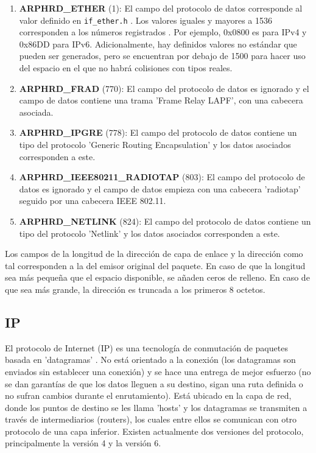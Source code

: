 \begin{enumerate}
    \item \textbf{ARPHRD\_ETHER} (1): El campo del protocolo de datos corresponde al valor definido en \texttt{if\_ether.h} \cite{linuxifether}. Los valores iguales y mayores a 1536 corresponden a los números registrados \cite{etherprotocolnumbers}. Por ejemplo, 0x0800 es para IPv4 y 0x86DD para IPv6. Adicionalmente, hay definidos valores no estándar que pueden ser generados, pero se encuentran por debajo de 1500 para hacer uso del espacio en el que no habrá colisiones con tipos reales.
    \item \textbf{ARPHRD\_FRAD} (770): El campo del protocolo de datos es ignorado y el campo de datos contiene una trama 'Frame Relay LAPF', con una cabecera asociada. 
    \item \textbf{ARPHRD\_IPGRE} (778): El campo del protocolo de datos contiene un tipo del protocolo 'Generic Routing Encapsulation' y los datos asociados corresponden a este.
    \item \textbf{ARPHRD\_IEEE80211\_RADIOTAP} (803): El campo del protocolo de datos es ignorado y el campo de datos empieza con una cabecera 'radiotap' seguido por una cabecera IEEE 802.11.
    \item \textbf{ARPHRD\_NETLINK} (824): El campo del protocolo de datos contiene un tipo del protocolo 'Netlink' y los datos asociados corresponden a este.
\end{enumerate}

Los campos de la longitud de la dirección de capa de enlace y la dirección como tal corresponden a la del emisor original del paquete. En caso de que la longitud sea más pequeña que el espacio disponible, se añaden ceros de relleno. En caso de que sea más grande, la dirección es truncada a los primeros 8 octetos.

\subsection{IP} \label{ipformat}

El protocolo de Internet (IP) es una tecnología de conmutación de paquetes basada en 'datagramas' \cite{iptechslides}. No está orientado a la conexión (los datagramas son enviados sin establecer una conexión) y se hace una entrega de mejor esfuerzo (no se dan garantías de que los datos lleguen a su destino, sigan una ruta definida o no sufran cambios durante el enrutamiento). Está ubicado en la capa de red, donde los puntos de destino se les llama 'hosts' y los datagramas se transmiten a través de intermediarios (routers), los cuales entre ellos se comunican con otro protocolo de una capa inferior. Existen actualmente dos versiones del protocolo, principalmente la versión 4 y la versión 6.

